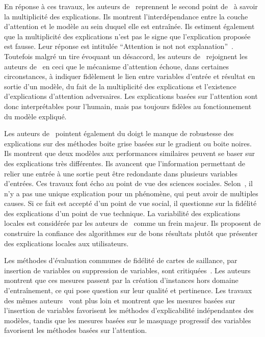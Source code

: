 En réponse à ces travaux, les auteurs de~\cite{Wiegreffe2019} reprennent le second point de~\cite{Jain2019} à savoir la multiplicité des explications. Ils montrent l'interdépendance entre la couche d'attention et le modèle au sein duquel elle est entraînée. Ils estiment également que la multiplicité des explications n'est pas le signe que l'explication proposée est fausse. Leur réponse est intitulée ``Attention is not not explanation''~\cite{Wiegreffe2019}.
Toutefois malgré un tire évoquant un désaccord, les auteurs de~\cite{Wiegreffe2019} rejoignent les auteurs de~\cite{Jain2019} en ceci que le mécanisme d'attention échoue, dans certaines circonstances, à indiquer fidèlement le lien entre variables d'entrée et résultat en sortie d'un modèle, du fait de la multiplicité des explications et l'existence d'explications d'attention adversaires. Les explications basées sur l'attention sont donc interprétables pour l'humain, mais pas toujours fidèles au fonctionnement du modèle expliqué.

Les auteurs de~\cite{Zafar2021} pointent également du doigt le manque de robustesse des explications sur des méthodes boite grise basées sur le gradient ou boite noires. Ils montrent que deux modèles aux performances similaires peuvent se baser sur des explications très différentes. Ils avancent que l'information permettant de relier une entrée à une sortie peut être redondante dans plusieurs variables d'entrées. Ces travaux font écho au point de vue des sciences sociales. Selon~\cite{Miller2019}, il n'y a pas une unique explication pour un phénomène, qui peut avoir de multiples causes. Si ce fait est accepté d'un point de vue social, il questionne sur la fidélité des explications d'un point de vue technique. La variabilité des explications locales est considérée par les auteurs de~\cite{Ghassemi2021,Lipton2018} comme un frein majeur. Ils proposent de construire la confiance des algorithmes sur de bons résultats plutôt que présenter des explications locales aux utilisateurs.

Les méthodes d'évaluation communes de fidélité de cartes de saillance, par insertion de variables ou suppression de variables, sont critiquées~\cite{Gomez2022}. Les auteurs montrent que ces mesures passent par la création d'instances hors domaine d'entraînement, ce qui pose question sur leur qualité et pertinence. Les travaux des mêmes auteurs~\cite{Gomez2022a} vont plus loin et montrent que les mesures basées sur l'insertion de variables favorisent les méthodes d'explicabilité indépendantes des modèles, tandis que les mesures basées sur le masquage progressif des variables favorisent les méthodes basées sur l'attention.

